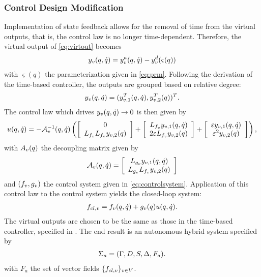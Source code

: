 \subsubsection{Control Design Modification}
Implementation of state feedback allows for the removal of time from the virtual
outputs, that is, the control law is no longer time-dependent.
%
Therefore, the virtual output of \eqref{eq:virtout} becomes
\begin{align*}
  y_{v}(q, {\dot q}) = y_{v}^a(q, {\dot q}) - y_{v}^{d}(\varsigma(q))
\end{align*}
with $\varsigma(q)$ the parameterization given in \eqref{eq:prm}.
%
Following the derivation of the time-based controller, the outputs are grouped
based on relative degree:
\begin{align*}
  y_{v}(q, {\dot q}) = (y_{v,1}^{T}(q, {\dot q}), y_{v,2}^{T}(q))^{T}.
\end{align*}
The control law which drives $y_{v}(q, {\dot q}) \to 0$ is then given by
\begin{align*}
  u(q, {\dot q}) = -\mathcal{A}_{v}^{-1}(q, {\dot q}) \left(
  \left[ \begin{array}{c}
      0\\
      L_{f_{v}} L_{f_{v}} y_{v,2}(q)
    \end{array} \right] +
  \left[ \begin{array}{c}
      L_{f_{v}} y_{v,1}(q, {\dot q})\\
      2 \varepsilon L_{f_{v}} y_{v,2}(q)
    \end{array} \right] +
  \left[ \begin{array}{c}
      \varepsilon y_{v,1}(q, {\dot q})\\
      \varepsilon^2 y_{v,2}(q)
    \end{array} \right]\right),
\end{align*}
with $A_{v}(q)$ the decoupling matrix given by
\begin{align}
  \mathcal{A}_{v}(q, {\dot q}) =
  \left[\begin{array}{c}
      L_{g_{v}} y_{v,1} (q, {\dot q})\\
      L_{g_{v}} L_{f_{v}} y_{{v},2}(q)
    \end{array}\right]
\end{align}
and $(f_{v}, g_{v})$ the control system given in \eqref{eq:controlsystem}.
%
Application of this control law to the control system yields the closed-loop
system:
\begin{align}
  f_{cl,v} = f_{v}(q, {\dot q}) + g_{v}(q) u(q, {\dot q}).
\end{align}
The virtual outputs are chosen to be the same as those in the time-based
controller, specified in .
%
The end result is an autonomous hybrid system specified by
\begin{align}
  \Sigma_{a} = (\Gamma, D, S, \Delta, F_a).
\end{align}
with $F_a$ the set of vector fields $\{f_{cl,v}\}_{v \in V}$.


